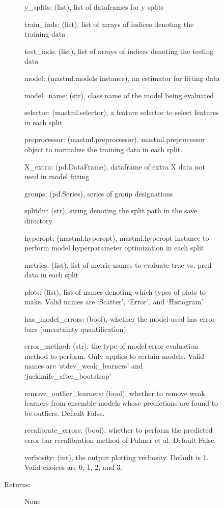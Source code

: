\documentclass[letterpaper,10pt,english]{sphinxmanual}
\begin{document}
\begin{fulllineitems}
\begin{description}
\begin{description}
\begin{description}
y\_splits: (list), list of dataframes for y splits

train\_inds: (list), list of arrays of indices denoting the training data

test\_inds: (list), list of arrays of indices denoting the testing data

model: (mastml.models instance), an estimator for fitting data

model\_name: (str), class name of the model being evaluated

selector: (mastml.selector), a feature selector to select features in each split

preprocessor: (mastml.preprocessor), mastml.preprocessor object to normalize the training data in each split.

X\_extra: (pd.DataFrame), dataframe of extra X data not used in model fitting

groups: (pd.Series), series of group designations

splitdir: (str), string denoting the split path in the save directory

hyperopt: (mastml.hyperopt), mastml.hyperopt instance to perform model hyperparameter optimization in each split

metrics: (list), list of metric names to evaluate true vs. pred data in each split

plots: (list), list of names denoting which types of plots to make. Valid names are ‘Scatter’, ‘Error’, and ‘Histogram’

has\_model\_errors: (bool), whether the model used has error bars (uncertainty quantification)

error\_method: (str), the type of model error evaluation method to perform. Only applies to certain models. Valid names are ‘stdev\_weak\_learners’ and ‘jackknife\_after\_bootstrap’

remove\_outlier\_learners: (bool), whether to remove weak learners from ensemble models whose predictions are found to be outliers. Default False.

recalibrate\_errors: (bool), whether to perform the predicted error bar recalibration method of Palmer et al. Default False.

verbosity: (int), the output plotting verbosity. Default is 1. Valid choices are 0, 1, 2, and 3.

\item[{Returns:}] \leavevmode
None

\end{description}


\end{description}
\end{description}
\end{fulllineitems}
\end{document}
